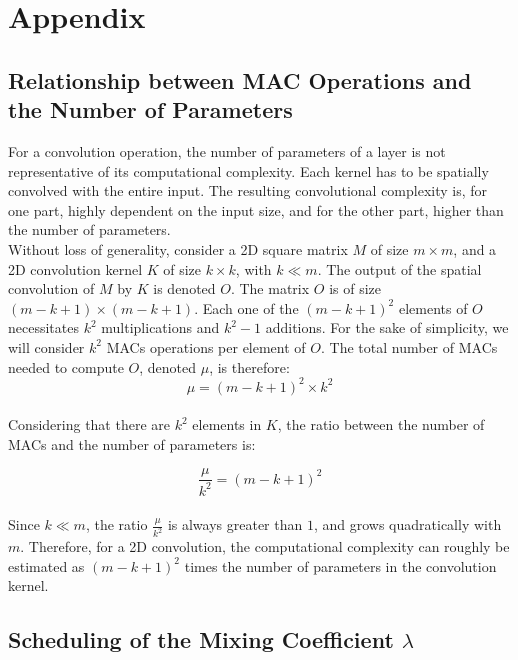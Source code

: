 \appendix

\chapter{Appendix}

\section{Relationship between \acl{MAC} Operations and the Number of Parameters}\label{sec:appendix:macs}

For a convolution operation, the number of parameters of a layer is not
representative of its computational complexity. Each kernel has to be spatially
convolved with the entire input. The resulting convolutional complexity is, for
one part, highly dependent on the input size, and for the other part, higher
than the number of parameters.\\

Without loss of generality, consider a 2D square matrix $M$ of size $m \times
m$, and a 2D convolution kernel $K$ of size $k \times k$, with $k\ll m$. The output
of the spatial convolution of $M$ by $K$ is denoted $O$. The matrix $O$ is of
size $(m-k+1) \times (m-k+1)$. Each one of the $(m-k+1)^2$ elements of $O$
necessitates $k^2$ multiplications and $k^2-1$ additions. For the sake of
simplicity, we will consider $k^2$ \acfp{MAC} operations per element of $O$. The
total number of \acp{MAC} needed to compute $O$, denoted $\mu$, is therefore:\\
$$
    \mu = (m-k+1)^2 \times k^2
$$\\

Considering that there are $k^2$ elements in $K$, the ratio between the number
of \acp{MAC} and the number of parameters is:

$$
    \frac{\mu}{k^2} = (m-k+1)^2
$$\\


Since $k\ll m$, the ratio $\frac{\mu}{k^2}$ is always greater than $1$, and
grows quadratically with $m$. Therefore, for a 2D convolution, the computational
complexity can roughly be estimated as $(m-k+1)^2$ times the number of
parameters in the convolution kernel.\\

\section{Scheduling of the Mixing Coefficient \texorpdfstring{$\lambda$}{lambda}}
\label{sec:appendix:annihilation}

